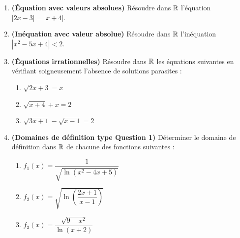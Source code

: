 \begin{enumerate}[label=\textbf{Exercice 2.\arabic* :}, leftmargin=*]
    \item \textbf{(Équation avec valeurs absolues)} Résoudre dans $\mathbb{R}$ l'équation $|2x - 3| = |x + 4|$.
    \item \textbf{(Inéquation avec valeur absolue)} Résoudre dans $\mathbb{R}$ l'inéquation $|x^2 - 5x + 4| < 2$.
    \item \textbf{(Équations irrationnelles)} Résoudre dans $\mathbb{R}$ les équations suivantes en vérifiant soigneusement l'absence de solutions parasites :
    \begin{enumerate}[label=(\alph*)]
        \item $\sqrt{2x + 3} = x$
        \item $\sqrt{x + 4} + x = 2$
        \item $\sqrt{3x + 1} - \sqrt{x - 1} = 2$
    \end{enumerate}
    \item \textbf{(Domaines de définition type Question 1)} Déterminer le domaine de définition dans $\mathbb{R}$ de chacune des fonctions suivantes :
    \begin{enumerate}[label=(\alph*)]
        \item $f_1(x) = \dfrac{1}{\sqrt{\ln(x^2 - 4x + 5)}}$
        \item $f_2(x) = \sqrt{\ln\left(\dfrac{2x + 1}{x - 1}\right)}$
        \item $f_3(x) = \dfrac{\sqrt{9 - x^2}}{\ln(x + 2)}$
    \end{enumerate}
\end{enumerate}
